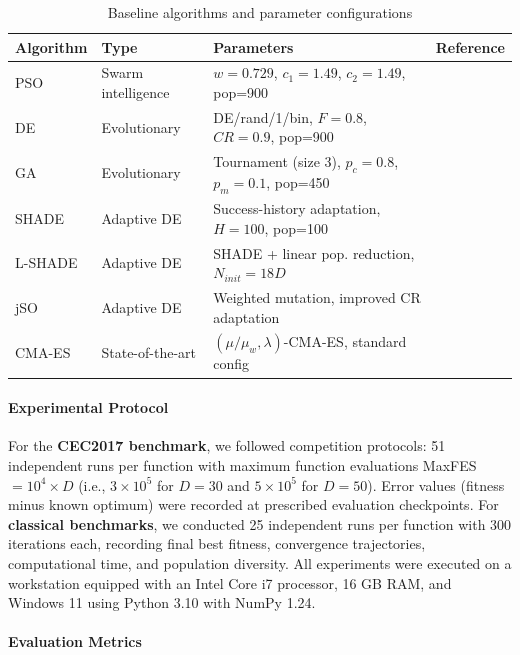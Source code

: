 \documentclass[11pt]{article}
\begin{document}
\begin{table}[ht]
\centering
\caption{Baseline algorithms and parameter configurations}
\label{tab:baselines}
\small
\begin{tabular}{@{}llp{5.5cm}l@{}}
\toprule
Algorithm & Type & Parameters & Reference \\
\midrule
PSO & Swarm intelligence & $w=0.729$, $c_1=1.49$, $c_2=1.49$, pop=900 & \cite{kennedy1995particle} \\
DE & Evolutionary & DE/rand/1/bin, $F=0.8$, $CR=0.9$, pop=900 & \cite{storn1997differential} \\
GA & Evolutionary & Tournament (size 3), $p_c=0.8$, $p_m=0.1$, pop=450 & \cite{goldberg1989genetic} \\
SHADE & Adaptive DE & Success-history adaptation, $H=100$, pop=100 & \cite{tanabe2013shade} \\
L-SHADE & Adaptive DE & SHADE + linear pop. reduction, $N_{init}=18D$ & \cite{tanabe2014lshade} \\
jSO & Adaptive DE & Weighted mutation, improved CR adaptation & \cite{brest2017jso} \\
CMA-ES & State-of-the-art & $(\mu/\mu_w, \lambda)$-CMA-ES, standard config & \cite{hansen2001completely} \\
\bottomrule
\end{tabular}
\end{table}

\paragraph{Experimental Protocol} For the \textbf{CEC2017 benchmark}, we followed competition protocols: 51 independent runs per function with maximum function evaluations MaxFES $= 10^4 \times D$ (i.e., $3 \times 10^5$ for $D=30$ and $5 \times 10^5$ for $D=50$). Error values (fitness minus known optimum) were recorded at prescribed evaluation checkpoints. For \textbf{classical benchmarks}, we conducted 25 independent runs per function with 300 iterations each, recording final best fitness, convergence trajectories, computational time, and population diversity. All experiments were executed on a workstation equipped with an Intel Core i7 processor, 16 GB RAM, and Windows 11 using Python 3.10 with NumPy 1.24.

\paragraph{Evaluation Metrics}
\end{document}
